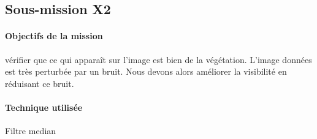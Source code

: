 \subsection{Sous-mission X2}

	\begin{vwcol}[widths={0.65,0.2}, rule=0pt]
	\begin{minipage}{0.7\textwidth}
	\paragraph{Objectifs de la mission}

	vérifier que ce qui apparaît sur l'image est bien de la végétation. L'image données est très perturbée par un bruit. Nous devons alors améliorer la visibilité en réduisant ce bruit.
	\end{minipage}

	\begin{minipage}{0.25\textwidth}
	\begin{flushright}
	\paragraph{Technique utilisée}
	
	Filtre median
	\end{flushright}
	\end{minipage}

	\end{vwcol} 

